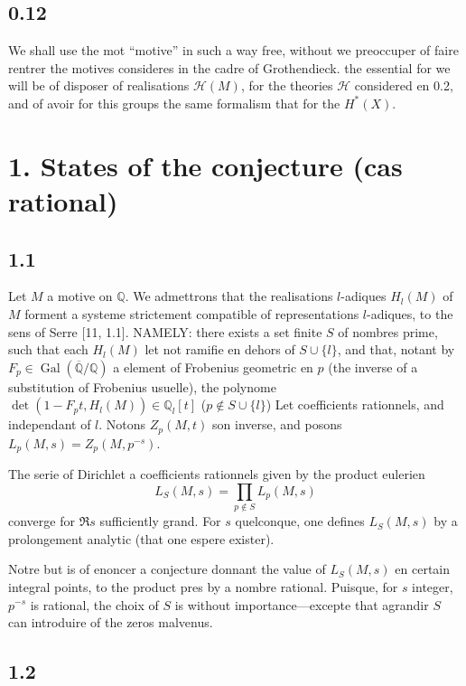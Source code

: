 \documentclass[12pt,a4paper]{article}
\theoremstyle{plain}
\theoremstyle{definition}
\theoremstyle{remark}
\DeclareMathOperator{\Gal}{Gal}
\newcommand{\Q}{\mathbb{Q}}
\begin{document}
\subsection*{0.12}

We shall use the mot ``motive'' in such a way free, without we preoccuper of faire rentrer
the motives consideres in the cadre of Grothendieck. the essential for we will be of
disposer of realisations $\mathcal{H}(M)$, for the theories $\mathcal{H}$ considered en 0.2, and of avoir for
this groups the same formalism that for the $H^*(X)$.


\section*{1. States of the conjecture (cas rational)}

\subsection*{1.1}

Let $M$ a motive on $\Q$. We admettrons that the realisations $l$-adiques $H_l(M)$ of $M$
forment a systeme strictement compatible of representations $l$-adiques, to the sens of
Serre [11, 1.1]. NAMELY: there exists a set finite $S$ of nombres prime, such that
each $H_l(M)$ let not ramifie en dehors of $S \cup \{l\}$, and that, notant by
$F_p \in \Gal(\overline{\Q}/\Q)$ a element of Frobenius geometric en $p$ (the inverse of a
substitution of Frobenius usuelle), the polynome $\det(1 - F_p t, H_l(M)) \in \Q_l[t]$
($p \notin S \cup \{l\}$) Let coefficients rationnels, and independant of $l$. Notons
$Z_p(M, t)$ son inverse, and posons $L_p(M, s) = Z_p(M, p^{-s})$.

The serie of Dirichlet a coefficients rationnels given by the product eulerien
\[
L_S(M, s) = \prod_{p \notin S} L_p(M, s)
\]
converge for $\Re s$ sufficiently grand. For $s$ quelconque, one defines $L_S(M, s)$ by a
prolongement analytic (that one espere exister).

Notre but is of enoncer a conjecture donnant the value of $L_S(M, s)$ en certain integral points, to the product pres by a nombre rational. Puisque, for $s$ integer,
$p^{-s}$ is rational, the choix of $S$ is without importance---excepte that agrandir $S$ can
introduire of the zeros malvenus.

\subsection*{1.2}
\end{document}
